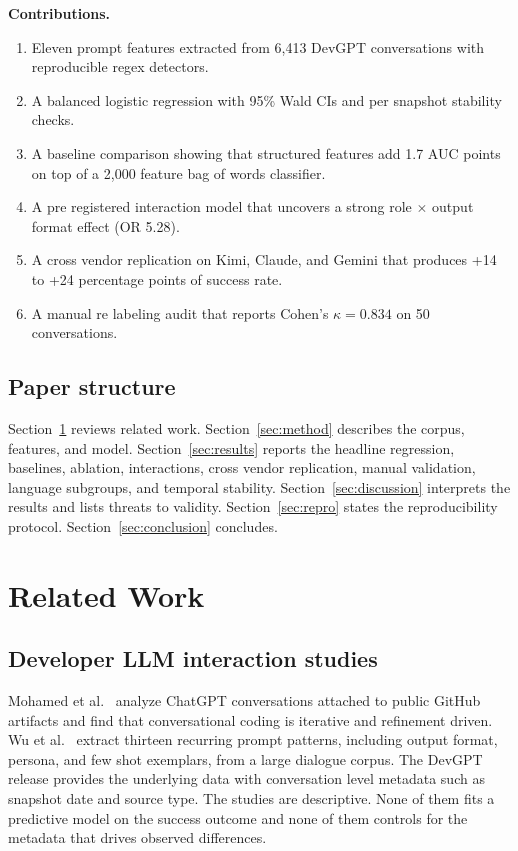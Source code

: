 \documentclass[conference]{IEEEtran}
\begin{document}
\noindent\textbf{Contributions.}
\begin{enumerate}
\item Eleven prompt features extracted from 6{,}413 DevGPT conversations with reproducible regex detectors.
\item A balanced logistic regression with 95\% Wald CIs and per snapshot stability checks.
\item A baseline comparison showing that structured features add 1.7 AUC points on top of a 2{,}000 feature bag of words classifier.
\item A pre registered interaction model that uncovers a strong role $\times$ output format effect (OR 5.28).
\item A cross vendor replication on Kimi, Claude, and Gemini that produces +14 to +24 percentage points of success rate.
\item A manual re labeling audit that reports Cohen's $\kappa = 0.834$ on 50 conversations.
\end{enumerate}

\subsection{Paper structure}
Section~\ref{sec:related} reviews related work. Section~\ref{sec:method} describes the corpus, features, and model. Section~\ref{sec:results} reports the headline regression, baselines, ablation, interactions, cross vendor replication, manual validation, language subgroups, and temporal stability. Section~\ref{sec:discussion} interprets the results and lists threats to validity. Section~\ref{sec:repro} states the reproducibility protocol. Section~\ref{sec:conclusion} concludes.

\section{Related Work}\label{sec:related}

\subsection{Developer LLM interaction studies}
Mohamed et al.\ \cite{empirical2024chatgpt} analyze ChatGPT conversations attached to public GitHub artifacts and find that conversational coding is iterative and refinement driven. Wu et al.\ \cite{wu2024promptpatterns} extract thirteen recurring prompt patterns, including output format, persona, and few shot exemplars, from a large dialogue corpus. The DevGPT release \cite{xiao2023devgpt} provides the underlying data with conversation level metadata such as snapshot date and source type. The studies are descriptive. None of them fits a predictive model on the success outcome and none of them controls for the metadata that drives observed differences.
\end{document}
